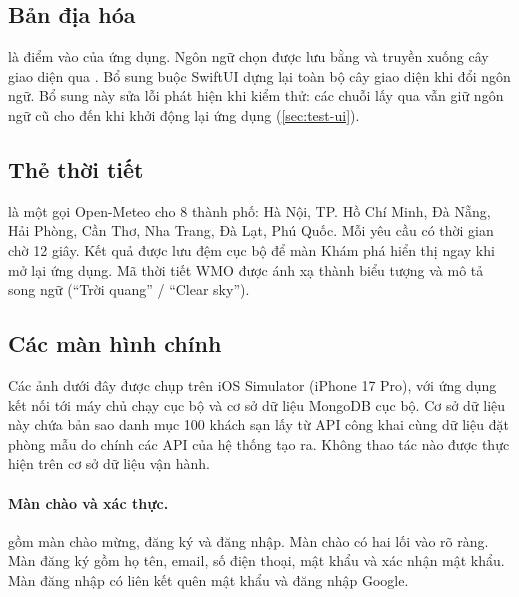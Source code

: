 \subsection{Bản địa hóa}

 là điểm vào của ứng dụng. Ngôn ngữ chọn được lưu bằng  và truyền xuống cây giao diện qua . Bổ sung  buộc SwiftUI dựng lại toàn bộ cây giao diện khi đổi ngôn ngữ. Bổ sung này sửa lỗi phát hiện khi kiểm thử: các chuỗi lấy qua  vẫn giữ ngôn ngữ cũ cho đến khi khởi động lại ứng dụng (\cref{sec:test-ui}).



\subsection{Thẻ thời tiết}

 là một  gọi Open-Meteo cho 8 thành phố: Hà Nội, TP. Hồ Chí Minh, Đà Nẵng, Hải Phòng, Cần Thơ, Nha Trang, Đà Lạt, Phú Quốc. Mỗi yêu cầu có thời gian chờ 12 giây. Kết quả được lưu đệm cục bộ để màn Khám phá hiển thị ngay khi mở lại ứng dụng. Mã thời tiết WMO được ánh xạ thành biểu tượng và mô tả song ngữ (``Trời quang'' / ``Clear sky'').

\subsection{Các màn hình chính}

Các ảnh dưới đây được chụp trên iOS Simulator (iPhone 17 Pro), với ứng dụng kết nối tới máy chủ chạy cục bộ và cơ sở dữ liệu MongoDB cục bộ. Cơ sở dữ liệu này chứa bản sao danh mục 100 khách sạn lấy từ API công khai cùng dữ liệu đặt phòng mẫu do chính các API của hệ thống tạo ra. Không thao tác nào được thực hiện trên cơ sở dữ liệu vận hành.

\paragraph{Màn chào và xác thực.}  gồm màn chào mừng, đăng ký và đăng nhập. Màn chào có hai lối vào rõ ràng. Màn đăng ký gồm họ tên, email, số điện thoại, mật khẩu và xác nhận mật khẩu. Màn đăng nhập có liên kết quên mật khẩu và đăng nhập Google.

